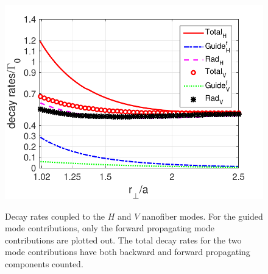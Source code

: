 \begin{figure}
\begin{minipage}{.91\linewidth}
\centering
{\includegraphics[scale=0.75]{../media/Figs/HVdecayrates}}
\end{minipage}
\caption{Decay rates coupled to the $ H $ and $ V $ nanofiber modes. For the guided mode contributions, only the forward propagating mode contributions are plotted out. The total decay rates for the two mode contributions have both backward and forward propagating components counted.}\label{fig:HVdecayrates}
\end{figure}

